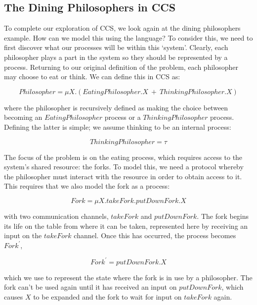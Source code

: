 \subsection{The Dining Philosophers in CCS}

To complete our exploration of CCS, we look again at the dining
philosophers example.  How can we model this using the language?  To
consider this, we need to first discover what our processes will be
within this `system'.  Clearly, each philosopher plays a part in the
system so they should be represented by a process.  Returning to our
original definition of the problem, each philosopher may choose to eat
or think.  We can define this in CCS as:

\begin{equation}
Philosopher = \mu X.(EatingPhilosopher.X\ +\ ThinkingPhilosopher.X)
\end{equation}

\noindent where the philosopher is recursively defined as making the
choice between becoming an $EatingPhilosopher$ process or a
$ThinkingPhilosopher$ process.  Defining the latter is simple; we assume
thinking to be an internal process:

\begin{equation}
ThinkingPhilosopher = \tau
\end{equation}

The focus of the problem is on the eating process, which requires access
to the system's shared resource: the forks.  To model this, we need a
protocol whereby the philosopher must interact with the resource in
order to obtain access to it.  This requires that we also model the fork
as a process:

\begin{equation}
Fork = \mu X.takeFork.putDownFork.X
\end{equation}

\noindent with two communication channels, $takeFork$ and $putDownFork$.
The fork begins its life on the table from where it can be taken,
represented here by receiving an input on the $takeFork$ channel.  Once
this has occurred, the process becomes $Fork^\prime$,

\begin{equation}
Fork^\prime = putDownFork.X
\end{equation}

\noindent which we use to represent the state where the fork is in use by a
philosopher.  The fork can't be used again until it has received an
input on $putDownFork$, which causes $X$ to be expanded and the fork to
wait for input on $takeFork$ again.

